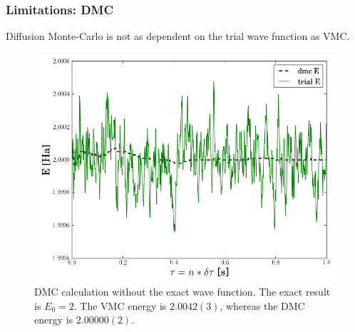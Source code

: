 \begin{frame}
   \frametitle{Limitations: DMC}
   
   Diffusion Monte-Carlo is not as dependent on the trial wave function as VMC.
   
\end{frame}

\begin{frame}
 \begin{figure}
  \begin{center}
   \includegraphics[scale=0.35]{../graphics/DMC_notExactWF.png}
  \end{center}
  \caption{DMC calculation without the exact wave function. The exact result is $E_0=2$. The VMC energy is $2.0042(3)$, whereas the DMC energy is $2.00000(2)$.}
 \end{figure}
\end{frame}







